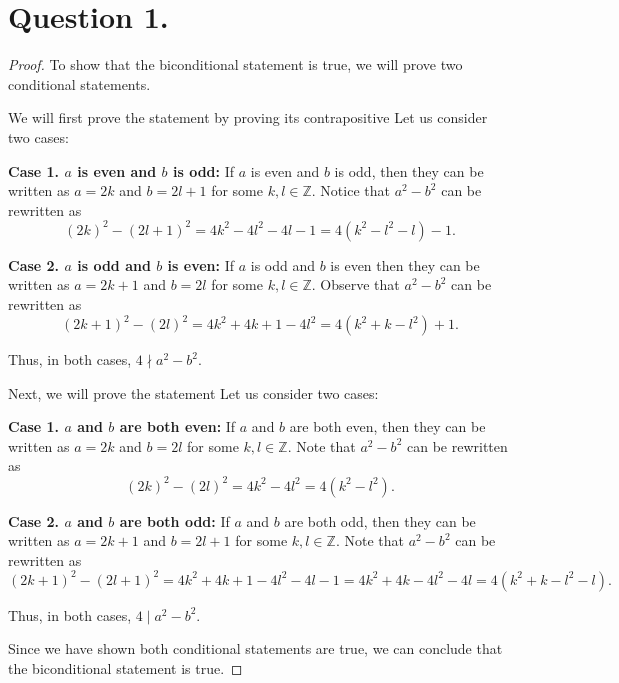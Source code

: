 \documentclass{article}
\begin{document}
\section*{Question 1.}
\begin{proof}
    To show that the biconditional statement is true, we will prove two conditional statements.

    \noindent We will first prove the statement  by proving its contrapositive 
    Let us consider two cases:
    
    \noindent \textbf{Case 1. $ a $ is even and $ b $ is odd:} If $ a $ is even and $ b $ is odd, then they can be written as $ a = 2k $ and $ b = 2l + 1 $ for some $ k, l \in \mathbb{Z} $. Notice that $ a^2 - b^2 $ can be rewritten as
    \[
        (2k)^2 - (2l + 1)^2 = 4k^2 - 4l^2 - 4l - 1 = 4(k^2 - l^2 - l) - 1.
    \]

    \noindent \textbf{Case 2. $ a $ is odd and $ b $ is even:} If $ a $ is odd and $ b $ is even then they can be written as $ a = 2k + 1 $ and $ b = 2l $ for some $ k, l \in \mathbb{Z} $. Observe that $ a^2 - b^2 $ can be rewritten as
    \[
        (2k + 1)^2 - (2l)^2 = 4k^2 + 4k + 1 - 4l^2 = 4(k^2 + k - l^2) + 1. 
    \]

    \noindent Thus, in both cases, $ 4 \nmid a^2 - b^2 $.

    \noindent Next, we will prove the statement  Let us consider two cases:

    \noindent \textbf{Case 1. $ a $ and $ b $ are both even:} If $ a $ and $ b $ are both even, then they can be written as $ a = 2k $ and $ b = 2l $ for some $ k, l \in \mathbb{Z} $. Note that $ a^2 - b^2 $ can be rewritten as
    \[
        (2k)^2 - (2l)^2 = 4k^2 - 4l^2 = 4(k^2 - l^2).
    \]

    \noindent \textbf{Case 2. $ a $ and $ b $ are both odd:} If $ a $ and $ b $ are both odd, then they can be written as $ a = 2k + 1 $ and $ b = 2l + 1 $ for some $ k, l \in \mathbb{Z} $. Note that $ a^2 - b^2 $ can be rewritten as
    \[
        (2k + 1)^2 - (2l + 1)^2 = 4k^2 + 4k + 1 - 4l^2 - 4l - 1 = 4k^2 + 4k - 4l^2 - 4l = 4(k^2 + k - l^2 - l).
    \]

    \noindent Thus, in both cases, $ 4 \mid a^2 - b^2 $.

    \noindent Since we have shown both conditional statements are true, we can conclude that the biconditional statement is true.
\end{proof}
\end{document}
